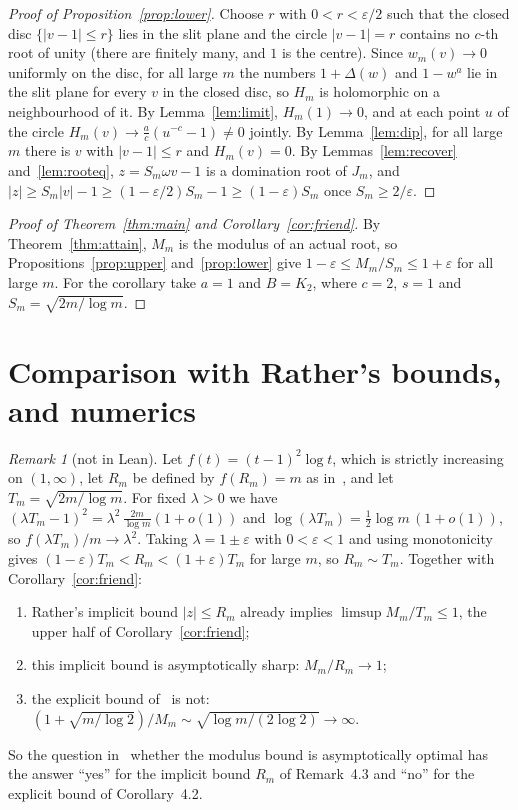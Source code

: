 \documentclass[11pt]{article}
\theoremstyle{definition}
\theoremstyle{remark}
\newtheorem{remark}{Remark}
\begin{document}
\begin{proof}[Proof of Proposition~\ref{prop:lower}]
Choose $r$ with $0<r<\varepsilon/2$ such that the closed disc
$\{|v-1|\le r\}$ lies in the slit plane and the circle $|v-1|=r$ contains no
$c$-th root of unity (there are finitely many, and $1$ is the centre). Since
$w_m(v)\to0$ uniformly on the disc, for all large $m$ the numbers
$1+\Delta(w)$ and $1-w^a$ lie in the slit plane for every $v$ in the closed
disc, so $H_m$ is holomorphic on a neighbourhood of it. By
Lemma~\ref{lem:limit}, $H_m(1)\to0$, and at each point $u$ of the circle
$H_m(v)\to\frac ac(u^{-c}-1)\ne0$ jointly. By Lemma~\ref{lem:dip}, for all
large $m$ there is $v$ with $|v-1|\le r$ and $H_m(v)=0$. By
Lemmas~\ref{lem:recover} and~\ref{lem:rooteq}, $z=S_m\omega v-1$ is a
domination root of $J_m$, and
$|z|\ge S_m|v|-1\ge(1-\varepsilon/2)S_m-1\ge(1-\varepsilon)S_m$ once
$S_m\ge2/\varepsilon$.
\end{proof}

\begin{proof}[Proof of Theorem~\ref{thm:main} and Corollary~\ref{cor:friend}]
By Theorem~\ref{thm:attain}, $M_m$ is the modulus of an actual root, so
Propositions~\ref{prop:upper} and~\ref{prop:lower} give
$1-\varepsilon\le M_m/S_m\le1+\varepsilon$ for all large $m$. For the
corollary take $a=1$ and $B=K_2$, where $c=2$, $s=1$ and
$S_m=\sqrt{2m/\log m}$.
\end{proof}

\section{Comparison with Rather's bounds, and numerics}\label{sec:rather}

\begin{remark}[not in Lean]\label{rem:rather}
Let $f(t)=(t-1)^2\log t$, which is strictly increasing on $(1,\infty)$, let
$R_m$ be defined by $f(R_m)=m$ as in~\cite[Remark~4.3]{ra}, and let
$T_m=\sqrt{2m/\log m}$. For fixed $\lambda>0$ we have
$(\lambda T_m-1)^2=\lambda^2\,\frac{2m}{\log m}(1+o(1))$ and
$\log(\lambda T_m)=\frac12\log m\,(1+o(1))$, so $f(\lambda T_m)/m\to\lambda^2$.
Taking $\lambda=1\pm\varepsilon$ with $0<\varepsilon<1$ and using monotonicity
gives
$(1-\varepsilon)T_m<R_m<(1+\varepsilon)T_m$ for large $m$, so
$R_m\sim T_m$. Together with Corollary~\ref{cor:friend}:
\begin{enumerate}
\item[(i)] Rather's implicit bound $|z|\le R_m$ already implies
$\limsup M_m/T_m\le1$, the upper half of Corollary~\ref{cor:friend};
\item[(ii)] this implicit bound is asymptotically sharp: $M_m/R_m\to1$;
\item[(iii)] the explicit bound of~\cite[Corollary~4.2]{ra} is not:
$(1+\sqrt{m/\log2})/M_m\sim\sqrt{\log m/(2\log2)}\to\infty$.
\end{enumerate}
So the question in~\cite{ra} whether the modulus bound is asymptotically
optimal has the answer ``yes'' for the implicit bound $R_m$ of Remark~4.3 and
``no'' for the explicit bound of Corollary~4.2.
\end{remark}
\end{document}

